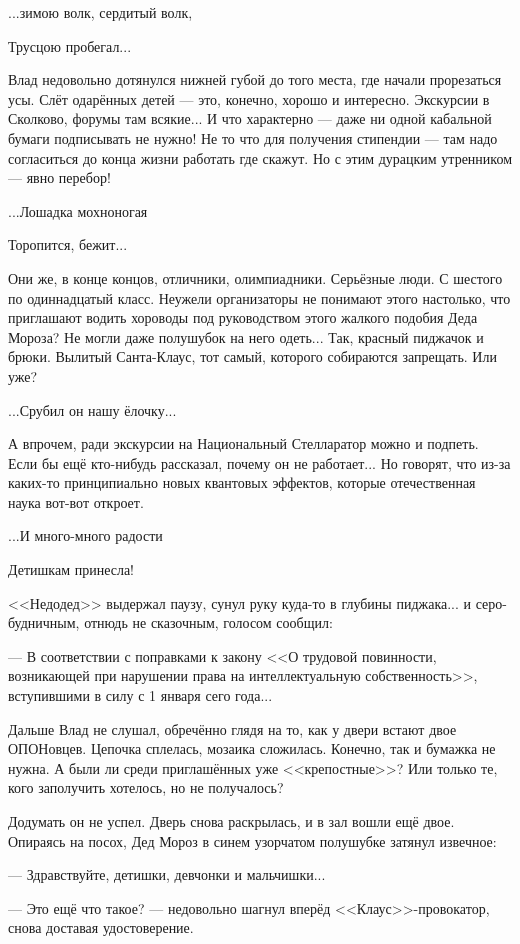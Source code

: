 ...зимою волк, сердитый волк,

Трусцою пробегал... 

Влад недовольно дотянулся нижней губой до того места, где начали прорезаться усы.
Слёт одарённых детей --- это, конечно, хорошо и интересно. Экскурсии в Сколково, форумы там всякие...
И что характерно --- даже ни одной кабальной бумаги подписывать не нужно!
Не то что для получения стипендии --- там надо согласиться до конца жизни работать где скажут.
Но с этим дурацким утренником --- явно перебор!

...Лошадка мохноногая

Торопится, бежит...

Они же, в конце концов, отличники, олимпиадники. Серьёзные люди. С шестого по одиннадцатый класс.
Неужели организаторы не понимают этого настолько,
что приглашают водить хороводы под руководством этого жалкого подобия Деда Мороза?
Не могли даже полушубок на него одеть... Так, красный пиджачок и брюки.
Вылитый Санта-Клаус, тот самый, которого собираются запрещать. Или уже?

...Срубил он нашу ёлочку...

А впрочем, ради экскурсии на Национальный Стелларатор можно и подпеть.
Если бы ещё кто-нибудь рассказал, почему он не работает...
Но говорят, что из-за каких-то принципиально новых квантовых эффектов, которые отечественная наука вот-вот откроет.

...И много-много радости

Детишкам принесла!

<<Недодед>> выдержал паузу, сунул руку куда-то в глубины пиджака... и серо-будничным, отнюдь не сказочным, голосом сообщил:

--- В соответствии с поправками к закону
<<О трудовой повинности, возникающей при нарушении права на интеллектуальную собственность>>,
вступившими в силу с 1 января сего года...

Дальше Влад не слушал, обречённо глядя на то, как у двери встают двое ОПОНовцев.
Цепочка сплелась, мозаика сложилась. Конечно, так и бумажка не нужна. А были ли среди приглашённых уже <<крепостные>>?
Или только те, кого заполучить хотелось, но не получалось?

Додумать он не успел. Дверь снова раскрылась, и в зал вошли ещё двое.
Опираясь на посох, Дед Мороз в синем узорчатом полушубке затянул извечное:

--- Здравствуйте, детишки, девчонки и мальчишки...

--- Это ещё что такое? --- недовольно шагнул вперёд <<Клаус>>-провокатор, снова доставая удостоверение.

